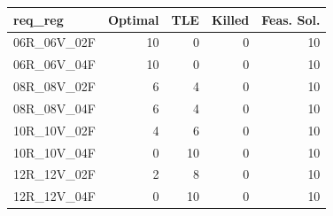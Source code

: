 
\begin{tabular}{lrrrr}
\toprule
req\_reg & Optimal & TLE & Killed & Feas. Sol.\\
\midrule
06R\_06V\_02F & 10 & 0 & 0 & 10\\
06R\_06V\_04F & 10 & 0 & 0 & 10\\
08R\_08V\_02F & 6 & 4 & 0 & 10\\
08R\_08V\_04F & 6 & 4 & 0 & 10\\
10R\_10V\_02F & 4 & 6 & 0 & 10\\
\addlinespace
10R\_10V\_04F & 0 & 10 & 0 & 10\\
12R\_12V\_02F & 2 & 8 & 0 & 10\\
12R\_12V\_04F & 0 & 10 & 0 & 10\\
\bottomrule
\end{tabular}
